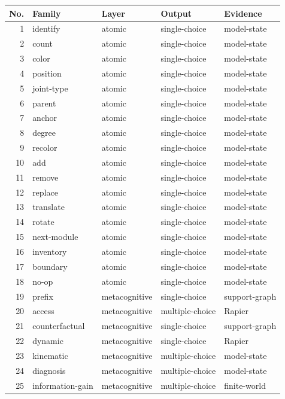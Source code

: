 \begin{center}\scriptsize\begin{tabular}{rllll}\toprule No. & Family & Layer & Output & Evidence\\\midrule
1 & identify & atomic & single-choice & model-state \\
2 & count & atomic & single-choice & model-state \\
3 & color & atomic & single-choice & model-state \\
4 & position & atomic & single-choice & model-state \\
5 & joint-type & atomic & single-choice & model-state \\
6 & parent & atomic & single-choice & model-state \\
7 & anchor & atomic & single-choice & model-state \\
8 & degree & atomic & single-choice & model-state \\
9 & recolor & atomic & single-choice & model-state \\
10 & add & atomic & single-choice & model-state \\
11 & remove & atomic & single-choice & model-state \\
12 & replace & atomic & single-choice & model-state \\
13 & translate & atomic & single-choice & model-state \\
14 & rotate & atomic & single-choice & model-state \\
15 & next-module & atomic & single-choice & model-state \\
16 & inventory & atomic & single-choice & model-state \\
17 & boundary & atomic & single-choice & model-state \\
18 & no-op & atomic & single-choice & model-state \\
19 & prefix & metacognitive & single-choice & support-graph \\
20 & access & metacognitive & multiple-choice & Rapier \\
21 & counterfactual & metacognitive & single-choice & support-graph \\
22 & dynamic & metacognitive & single-choice & Rapier \\
23 & kinematic & metacognitive & multiple-choice & model-state \\
24 & diagnosis & metacognitive & multiple-choice & model-state \\
25 & information-gain & metacognitive & multiple-choice & finite-world \\

\end{tabular}
\end{center}
